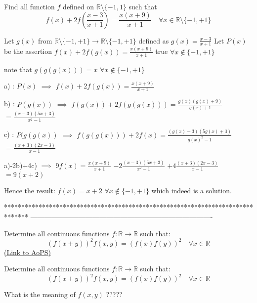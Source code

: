 \begin{solution}
	\begin{tcolorbox}Find all function $f$ defined on $\mathbb{R}\setminus  \{-1, 1\}$ such that
\[f (x) + 2 f \left (\frac{x-3}{x +1}\right ) = \frac{x (x +9) }{ x +1} \quad \forall x \in \mathbb R \setminus  \{-1, +1\}\]\end{tcolorbox}
Let $g(x)$ from $\mathbb R\setminus\{-1,+1\}\to\mathbb R\setminus\{-1,+1\}$ defined as $g(x)=\frac{x-3}{x+1}$
Let $P(x)$ be the assertion $f(x)+2f(g(x))=\frac {x(x+9)}{x+1}$ true $\forall x\notin\{-1,+1\}$

note that $g(g(g(x)))=x$ $\forall x\notin\{-1,+1\}$

a) : $P(x)$ $\implies$ $f(x)+2f(g(x))=\frac {x(x+9)}{x+1}$

b) : $P(g(x))$ $\implies$ $f(g(x))+2f(g(g(x)))=\frac {g(x)(g(x)+9)}{g(x)+1}$ $=\frac{(x-3)(5x+3)}{x^2-1}$

c) : $P(g(g(x))$ $\implies$ $f(g(g(x)))+2f(x)=\frac{(g(x)-3)(5g(x)+3)}{g(x)^2-1}$ $=\frac{(x+3)(2x-3)}{x-1}$

a)-2b)+4c) $\implies$ $9f(x)=\frac {x(x+9)}{x+1}$ $-2\frac{(x-3)(5x+3)}{x^2-1}$ $+4\frac{(x+3)(2x-3)}{x-1}$ $=9(x+2)$

Hence the result: $\boxed{f(x)=x+2}$ $\forall x\notin\{-1,+1\}$ which indeed is a solution.
\end{solution}
*******************************************************************************
-------------------------------------------------------------------------------

\begin{problem}
	Determine all continuous functions $f: \mathbb R\to\mathbb R$ such that:
\[ (f (x + y))^2 f (x, y) = (f (x) f (y)) ^ 2 \quad \forall x\in\mathbb R\]
	\flushright \href{https://artofproblemsolving.com/community/c6h566570}{(Link to AoPS)}
\end{problem}



\begin{solution}
	\begin{tcolorbox}Determine all continuous functions $f: \mathbb R\to\mathbb R$ such that:
\[ (f (x + y))^2 f (x, y) = (f (x) f (y)) ^ 2 \quad \forall x\in\mathbb R\]\end{tcolorbox}
What is the meaning of $f(x,y)$ ?????
\end{solution}




